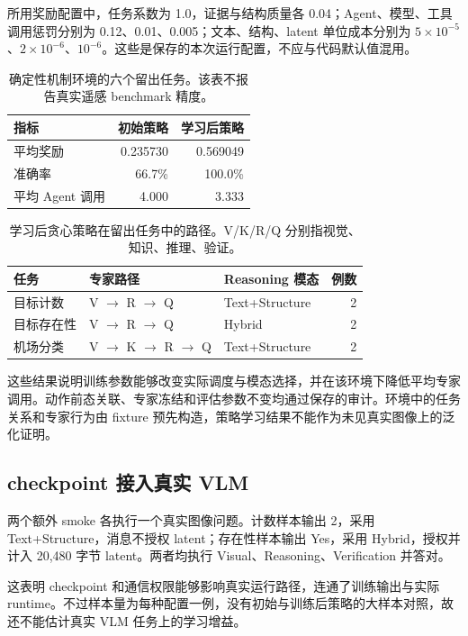 \documentclass[UTF8,a4paper,zihao=5,fontset=fandol]{ctexart}
\begin{document}
所用奖励配置中，任务系数为 1.0，证据与结构质量各 0.04；Agent、模型、工具调用惩罚分别为 0.12、0.01、0.005；文本、结构、latent 单位成本分别为 $5\times10^{-5}$、$2\times10^{-6}$、$10^{-6}$。这些是保存的本次运行配置，不应与代码默认值混用。

\begin{table}[h]
\centering\small
\caption{确定性机制环境的六个留出任务。该表不报告真实遥感 benchmark 精度。}
\begin{tabularx}{\textwidth}{Yrr}
\toprule
指标 & 初始策略 & 学习后策略\\
\midrule
平均奖励 & 0.235730 & 0.569049\\
准确率 & 66.7\% & 100.0\%\\
平均 Agent 调用 & 4.000 & 3.333\\
\bottomrule
\end{tabularx}
\end{table}

\begin{table}[h]
\centering\small
\caption{学习后贪心策略在留出任务中的路径。V/K/R/Q 分别指视觉、知识、推理、验证。}
\begin{tabularx}{\textwidth}{Yllr}
\toprule
任务 & 专家路径 & Reasoning 模态 & 例数\\
\midrule
目标计数 & V $\to$ R $\to$ Q & Text+Structure & 2\\
目标存在性 & V $\to$ R $\to$ Q & Hybrid & 2\\
机场分类 & V $\to$ K $\to$ R $\to$ Q & Text+Structure & 2\\
\bottomrule
\end{tabularx}
\end{table}

这些结果说明训练参数能够改变实际调度与模态选择，并在该环境下降低平均专家调用。动作前态关联、专家冻结和评估参数不变均通过保存的审计。环境中的任务关系和专家行为由 fixture 预先构造，策略学习结果不能作为未见真实图像上的泛化证明。

\subsection{checkpoint 接入真实 VLM}
两个额外 smoke 各执行一个真实图像问题。计数样本输出 2，采用 Text+Structure，消息不授权 latent；存在性样本输出 Yes，采用 Hybrid，授权并计入 20,480 字节 latent。两者均执行 Visual、Reasoning、Verification 并答对。

这表明 checkpoint 和通信权限能够影响真实运行路径，连通了训练输出与实际 runtime。不过样本量为每种配置一例，没有初始与训练后策略的大样本对照，故还不能估计真实 VLM 任务上的学习增益。
\end{document}
